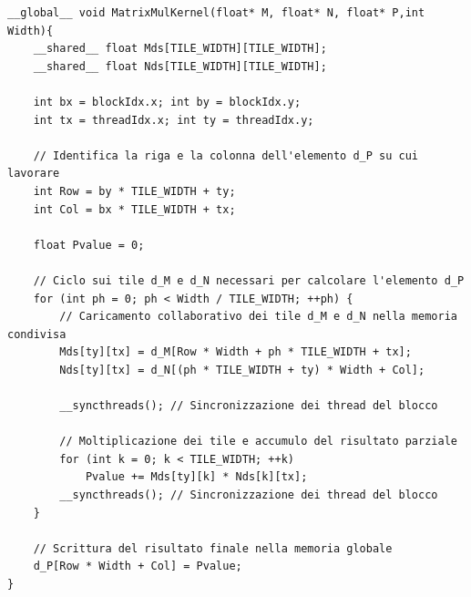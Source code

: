 \documentclass[10pt, letterpaper]{report}
\begin{document}
\begin{lstlisting}[style=CStyle]
__global__ void MatrixMulKernel(float* M, float* N, float* P,int Width){
    __shared__ float Mds[TILE_WIDTH][TILE_WIDTH];
    __shared__ float Nds[TILE_WIDTH][TILE_WIDTH];

    int bx = blockIdx.x; int by = blockIdx.y;
    int tx = threadIdx.x; int ty = threadIdx.y;

    // Identifica la riga e la colonna dell'elemento d_P su cui lavorare
    int Row = by * TILE_WIDTH + ty;
    int Col = bx * TILE_WIDTH + tx;

    float Pvalue = 0;

    // Ciclo sui tile d_M e d_N necessari per calcolare l'elemento d_P
    for (int ph = 0; ph < Width / TILE_WIDTH; ++ph) {
        // Caricamento collaborativo dei tile d_M e d_N nella memoria condivisa
        Mds[ty][tx] = d_M[Row * Width + ph * TILE_WIDTH + tx];
        Nds[ty][tx] = d_N[(ph * TILE_WIDTH + ty) * Width + Col];

        __syncthreads(); // Sincronizzazione dei thread del blocco

        // Moltiplicazione dei tile e accumulo del risultato parziale
        for (int k = 0; k < TILE_WIDTH; ++k) 
            Pvalue += Mds[ty][k] * Nds[k][tx];
        __syncthreads(); // Sincronizzazione dei thread del blocco
    }

    // Scrittura del risultato finale nella memoria globale
    d_P[Row * Width + Col] = Pvalue;
}
\end{lstlisting}
\end{document}

